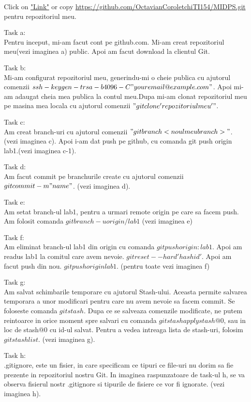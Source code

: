 Click on \href{https://github.com/OctavianCoroletchiTI154/MIDPS.git}{"Link"} or copy \url{https://github.com/OctavianCoroletchiTI154/MIDPS.git} pentru repozitoriul meu.
\par Task a: \\
Pentru inceput, mi-am facut cont pe github.com. Mi-am creat repozitoriul meu(vezi imaginea a) public. Apoi am facut download la clientul Git.
\par Task b: \\
Mi-am configurat repozitoriul meu, generindu-mi o cheie publica cu ajutorul comenzii $ssh-keygen -t rsa -b 4096 -C  "your email@example.com"$. Apoi mi-am adaugat cheia mea publica la contul meu.Dupa mi-am clonat repozitoriul meu pe masina mea locala cu ajutorul comenzii $"git clone 'repozitoriul meu' "$.\\
\par Task c:\\
Am creat branch-uri cu ajutorul comenzii $"git branch <noul meu branch> "$. (vezi imaginea c). Apoi i-am dat push pe github, cu comanda git push origin lab1.(vezi imaginea c-1).
\par Task d:\\
Am facut commit pe branchurile create cu ajutorul comenzii $git commit -m "name"$. (vezi imaginea d).
\par Task e:\\
Am setat branch-ul lab1, pentru a urmari remote origin pe care sa facem push. Am folosit comanda $git branch -u origin/lab1$ (vezi imaginea e)
\par Task f:\\
Am eliminat branch-ul lab1 din origin cu comanda $git push origin :lab1 $. Apoi am readus lab1 la comitul care avem nevoie.
$git reset --hard 'hashid' $. Apoi am facut push din nou. $git push origin lab1 $. (pentru toate vezi imaginea f)
\par Task g:\\
Am salvat schimbarile temporare cu ajutorul Stash-ului. Aceasta permite salvarea temporara a unor modificari pentru care nu avem nevoie sa facem commit. Se foloseste comanda $ git stash $. Dupa ce se salveaza comenzile modificate, ne putem reintoarce in orice moment spre salvari cu comanda $ git stash apply stash@{0} $, sau in loc de stash@{0} cu id-ul salvat. Pentru a vedea intreaga lista de stash-uri, folosim $ git stash list $. (vezi imaginea g).
\par Task h:\\
.gitignore, este un fisier, in care specificam ce tipuri ce file-uri nu dorim sa fie prezente in repozitoriul nostru Git. In imaginea raspunzatoare de task-ul h, se va observa fisierul nostr .gitignore si tipurile de fisiere ce vor fi ignorate. (vezi imaginea h).
